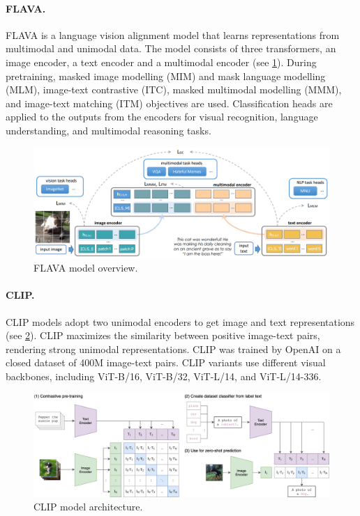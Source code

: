 \paragraph{FLAVA.} FLAVA \cite{singh2022flava} is a language vision alignment model that learns representations from multimodal and unimodal data. The model consists of three transformers, an image encoder, a text encoder and a multimodal encoder (see \cref{fig:flava}). During pretraining, masked image modelling (MIM) and mask language modelling (MLM), image-text contrastive (ITC), masked multimodal modelling (MMM), and image-text matching (ITM) objectives are used. Classification heads are applied to the outputs from the encoders for visual recognition, language understanding, and multimodal reasoning tasks.

\begin{figure}[ht]
    \centering
    \includegraphics[width=\linewidth]{images/models/flava.png}
    \caption{FLAVA model overview.}
    \label{fig:flava}
\end{figure}

\paragraph{CLIP.} CLIP \cite{radford2021clip} models adopt two
unimodal encoders to get image and text representations (see \cref{fig:clip}). CLIP maximizes the similarity between positive image-text pairs, rendering strong unimodal representations. CLIP was trained by OpenAI on a closed dataset of 400M image-text pairs. CLIP variants use different visual backbones, including ViT-B/16, ViT-B/32, ViT-L/14, and ViT-L/14-336.

\begin{figure}[ht]
    \centering
    \includegraphics[width=\linewidth]{images/models/clip.png}
    \caption{CLIP model architecture.}
    \label{fig:clip}
\end{figure}


